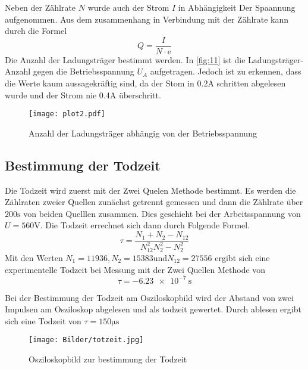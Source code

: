 Neben der Zählrate $N$ wurde auch der Strom $I$ in Abhängigkeit 
Der Spaannung aufgenommen. Aus dem zusammenhang in Verbindung 
mit der Zählrate kann durch die Formel 
\begin{equation}
    Q = \frac{I}{N \cdot \text{e}}
\end{equation}
Die Anzahl der Ladungsträger bestimmt werden. In \autoref{fig:11} ist die 
Ladungsträger-Anzahl gegen die Betriebsspannung $U_A$ aufgetragen. Jedoch ist 
zu erkennen, dass die Werte kaum aussagekräftig sind, da der Stom 
in $0.2 \unit{\ampere}$ schritten abgelesen wurde und der Strom 
nie $0.4 \unit{\ampere}$ überschritt.
\begin{figure}[H]
    \centering
    \caption{Anzahl der Ladungsträger abhängig von der Betriebsspannung}
    \label{fig:11}
    \texttt{[image: plot2.pdf]}
\end{figure}

\subsection{Bestimmung der Todzeit}
Die Todzeit wird zuerst mit der Zwei Quelen Methode bestimmt. Es 
werden die Zählraten zweier Quellen zunächst getrennt gemessen und 
dann die Zählrate über $200 \unit{\second}$ von beiden Quelllen zusammen. Dies geschieht bei der 
Arbeitsspannung von $U = 560 \unit{\volt}$. Die Todzeit errechnet sich dann 
durch Folgende Formel.
\begin{equation}
    \tau = \frac{N_\text{1} + N_\text{2} - N_\text{12}}{N_\text{12}^2  N_\text{2}^2 - N_\text{2}^2}
\end{equation}
Mit den Werten $N_\text{1} = 11936, N_\text{2} = 15383 $und$ N_\text{12} = 27556$ ergibt sich eine 
experimentelle Todzeit bei Messung mit der Zwei Quellen Methode von 
\begin{equation}
    \tau = \qty{-6.23e-7}{\second} 
\end{equation}

Bei der Bestimmung der Todzeit am Osziloskopbild wird der Abstand von zwei Impulsen am Osziloskop 
abgelesen und als todzeit gewertet. Durch ablesen ergibt sich eine Todzeit 
von $\tau = 150 \unit{\micro\second}$
\begin{figure}[H]
    \centering
    \caption{Osziloskopbild zur bestimmung der Todzeit}
    \label{fig:12}
    \texttt{[image: Bilder/totzeit.jpg]}
\end{figure} 

